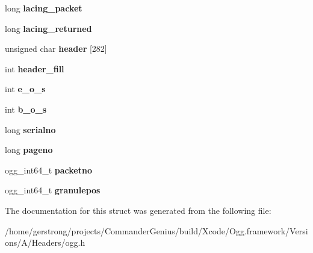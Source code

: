 \begin{DoxyCompactItemize}
\item 
\hypertarget{structogg__stream__state_add3aba822d7f0e2e23c1927a20aaa683}{
long {\bfseries lacing\_\-packet}}
\label{structogg__stream__state_add3aba822d7f0e2e23c1927a20aaa683}

\item 
\hypertarget{structogg__stream__state_a541d66311781b45cf37d87107d515602}{
long {\bfseries lacing\_\-returned}}
\label{structogg__stream__state_a541d66311781b45cf37d87107d515602}

\item 
\hypertarget{structogg__stream__state_aeb8496ef8051c2760c5d57424f30171a}{
unsigned char {\bfseries header} \mbox{[}282\mbox{]}}
\label{structogg__stream__state_aeb8496ef8051c2760c5d57424f30171a}

\item 
\hypertarget{structogg__stream__state_af37e7ffba5e7197c8bfabee7a1a6b641}{
int {\bfseries header\_\-fill}}
\label{structogg__stream__state_af37e7ffba5e7197c8bfabee7a1a6b641}

\item 
\hypertarget{structogg__stream__state_a366e94e72849e0e880d53a22bb9ee646}{
int {\bfseries e\_\-o\_\-s}}
\label{structogg__stream__state_a366e94e72849e0e880d53a22bb9ee646}

\item 
\hypertarget{structogg__stream__state_a76fcc3bf6a59eff87ec3bee1d16fa0b5}{
int {\bfseries b\_\-o\_\-s}}
\label{structogg__stream__state_a76fcc3bf6a59eff87ec3bee1d16fa0b5}

\item 
\hypertarget{structogg__stream__state_a79248e3f1f41cde5331909e8edd98e10}{
long {\bfseries serialno}}
\label{structogg__stream__state_a79248e3f1f41cde5331909e8edd98e10}

\item 
\hypertarget{structogg__stream__state_a0ad3315203fcebdc2ccd3b050d28a65c}{
long {\bfseries pageno}}
\label{structogg__stream__state_a0ad3315203fcebdc2ccd3b050d28a65c}

\item 
\hypertarget{structogg__stream__state_a1bebf380025b6ca0841497e7ab2b5c34}{
ogg\_\-int64\_\-t {\bfseries packetno}}
\label{structogg__stream__state_a1bebf380025b6ca0841497e7ab2b5c34}

\item 
\hypertarget{structogg__stream__state_a5df750c600660686e29f24b4d1ce836c}{
ogg\_\-int64\_\-t {\bfseries granulepos}}
\label{structogg__stream__state_a5df750c600660686e29f24b4d1ce836c}

\end{DoxyCompactItemize}


The documentation for this struct was generated from the following file:\begin{DoxyCompactItemize}
\item 
/home/gerstrong/projects/CommanderGenius/build/Xcode/Ogg.framework/Versions/A/Headers/ogg.h\end{DoxyCompactItemize}
